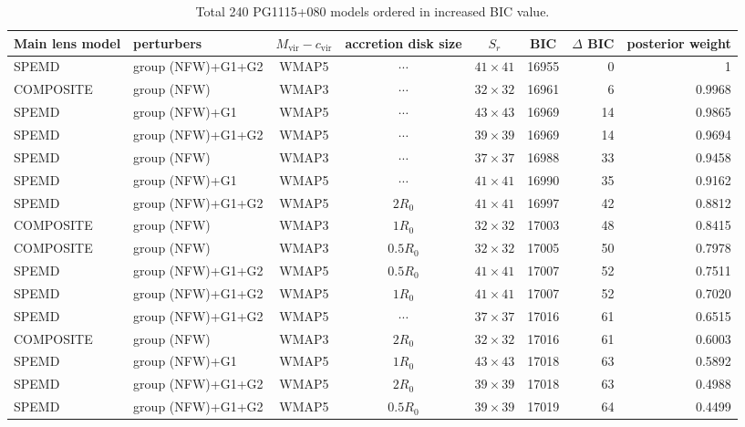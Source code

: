 \documentclass[useAMS,usenatbib]{mnras}
\def\nomicro{$\cdots$}
\begin{document}
\begin{table}
    \centering
    \caption{Total 240 PG1115+080 models ordered in increased BIC value.}
    \label{tab:6TD_1}
    \begin{tabular}{llccccrr}
        \hline
        Main lens model & perturbers &$M_{\textrm{vir}}-c_{\textrm{vir}}$& accretion disk size & $S_{r}$ & BIC & $\Delta$ BIC & posterior weight\\
        \hline
        SPEMD     & group (NFW)+G1+G2 &WMAP5 & \nomicro   &$41\times41$ & 16955 & 0  & 1\\ 
        COMPOSITE & group (NFW)       &WMAP3 & \nomicro   &$32\times32$ & 16961 & 6 & 0.9968\\
        SPEMD     & group (NFW)+G1    &WMAP5 & \nomicro   &$43\times43$ & 16969 & 14 & 0.9865\\ 
        SPEMD     & group (NFW)+G1+G2 &WMAP5 & \nomicro   &$39\times39$ & 16969 & 14 & 0.9694\\ 
        SPEMD     & group (NFW)       &WMAP3 & \nomicro   &$37\times37$ & 16988 & 33 & 0.9458\\ 
        SPEMD     & group (NFW)+G1    &WMAP5 & \nomicro   &$41\times41$ & 16990 & 35 & 0.9162\\ 
        SPEMD     & group (NFW)+G1+G2 &WMAP5 & $2R_{0}$   &$41\times41$ & 16997 & 42  & 0.8812\\ 
        COMPOSITE & group (NFW)       &WMAP3 & $1R_{0}$   &$32\times32$ & 17003 & 48 & 0.8415\\
        COMPOSITE & group (NFW)       &WMAP3 & $0.5R_{0}$ &$32\times32$ & 17005 & 50 & 0.7978\\
        SPEMD     & group (NFW)+G1+G2 &WMAP5 & $0.5R_{0}$ &$41\times41$ & 17007 & 52  & 0.7511\\ 
        SPEMD     & group (NFW)+G1+G2 &WMAP5 & $1R_{0}$   &$41\times41$ & 17007 & 52  & 0.7020\\
        SPEMD     & group (NFW)+G1+G2 &WMAP5 & \nomicro   &$37\times37$ & 17016 & 61 & 0.6515\\
        COMPOSITE & group (NFW)       &WMAP3 & $2R_{0}$   &$32\times32$ & 17016 & 61 & 0.6003\\
        SPEMD     & group (NFW)+G1    &WMAP5 & $1R_{0}$   &$43\times43$ & 17018 & 63 & 0.5892\\ 
        SPEMD     & group (NFW)+G1+G2 &WMAP5 & $2R_{0}$   &$39\times39$ & 17018 & 63 & 0.4988\\
        SPEMD     & group (NFW)+G1+G2 &WMAP5 & $0.5R_{0}$ &$39\times39$ & 17019 & 64 & 0.4499\\

\end{tabular}
\end{table}
\end{document}
